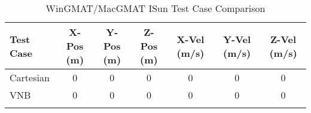 \begin{table}[htbp!]
\centering
\caption{ WinGMAT/MacGMAT ISun Test Case Comparison}
      \begin{tabular}{lcccccc}
      \hline\hline
          Test Case & X-Pos (m) & Y-Pos (m) & Z-Pos (m) & X-Vel (m/s) & Y-Vel (m/s) & Z-Vel (m/s) \\
         \hline
         Cartesian & 0 & 0 & 0 & 0 & 0 & 0 \\
         VNB & 0 & 0 & 0 & 0 & 0 & 0 \\
      \hline\hline
      \label{Table: ISun WinGMAT-MacGMAT Table} 
\end{tabular}
\end{table}
